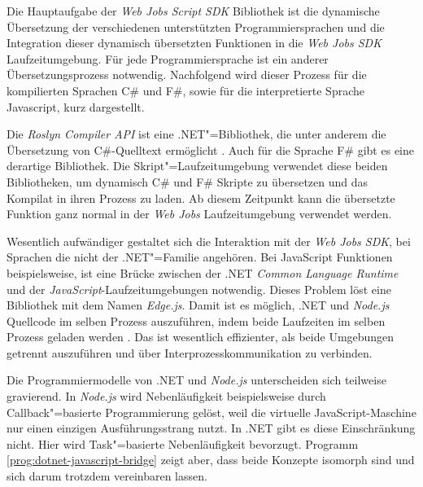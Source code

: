 Die Hauptaufgabe der \textit{Web Jobs Script SDK} Bibliothek ist die dynamische Übersetzung der verschiedenen unterstützten Programmiersprachen und die Integration dieser dynamisch übersetzten Funktionen in die \textit{Web Jobs SDK} Laufzeitumgebung. Für jede Programmiersprache ist ein anderer Übersetzungsprozess notwendig. Nachfolgend wird dieser Prozess für die kompilierten Sprachen C\# und F\#, sowie für die interpretierte Sprache Javascript, kurz dargestellt.

Die \textit{Roslyn Compiler API} ist eine .NET"=Bibliothek, die unter anderem die Übersetzung von C\#-Quelltext ermöglicht \cite[5]{Roslyn}. Auch für die Sprache F\# gibt es eine derartige Bibliothek. Die Skript"=Laufzeitumgebung verwendet diese beiden Bibliotheken, um dynamisch C\# und F\# Skripte zu übersetzen und das Kompilat in ihren Prozess zu laden. Ab diesem Zeitpunkt kann die übersetzte Funktion ganz normal in der \textit{Web Jobs} Laufzeitumgebung verwendet werden.

Wesentlich aufwändiger gestaltet sich die Interaktion mit der \textit{Web Jobs SDK}, bei Sprachen die nicht der .NET"=Familie angehören. Bei JavaScript Funktionen beispielsweise, ist eine Brücke zwischen der .NET \textit{Common Language Runtime} und der \textit{JavaScript}-Laufzeitumgebungen notwendig. Dieses Problem löst eine Bibliothek mit dem Namen \textit{Edge.js}. Damit ist es möglich, .NET und \textit{Node.js} Quellcode im selben Prozess auszuführen, indem beide Laufzeiten im selben Prozess geladen werden \cite{EdgeJs}. Das ist wesentlich effizienter, als beide Umgebungen getrennt auszuführen und über Interprozesskommunikation zu verbinden.

Die Programmiermodelle von .NET und \textit{Node.js} unterscheiden sich teilweise gravierend. In \textit{Node.js} wird Nebenläufigkeit beispielsweise durch Callback"=basierte Programmierung gelöst, weil die virtuelle JavaScript-Maschine nur einen einzigen Ausführungsstrang nutzt. In .NET gibt es diese Einschränkung nicht. Hier wird Task"=basierte Nebenläufigkeit bevorzugt. Programm \ref{prog:dotnet-javascript-bridge} zeigt aber, dass beide Konzepte isomorph sind und sich darum trotzdem vereinbaren lassen.

